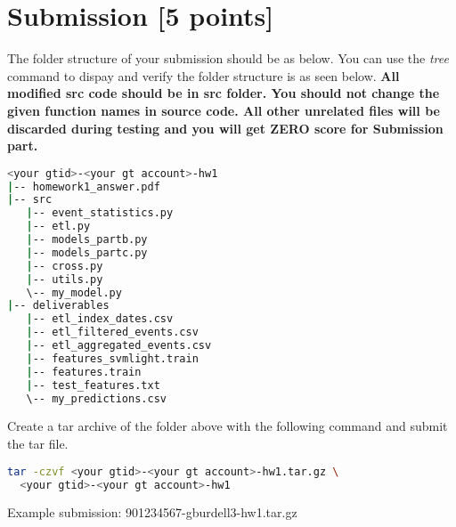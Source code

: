 \documentclass[12pt]{article}
\begin{document}
\section{Submission [5 points]}
The folder structure of your submission should be as below. You can use the \textit{tree} command to dispay and verify the folder structure is as seen below. \textbf{\color{red} All modified src code should be in src folder. You should not change the given function names in source code. All other unrelated files will be discarded during testing and you will get ZERO score for Submission part.}
\begin{lstlisting}[language=bash,frame=single]
<your gtid>-<your gt account>-hw1
|-- homework1_answer.pdf
|-- src
   |-- event_statistics.py
   |-- etl.py
   |-- models_partb.py
   |-- models_partc.py
   |-- cross.py
   |-- utils.py
   \-- my_model.py
|-- deliverables
   |-- etl_index_dates.csv
   |-- etl_filtered_events.csv
   |-- etl_aggregated_events.csv
   |-- features_svmlight.train
   |-- features.train
   |-- test_features.txt
   \-- my_predictions.csv

\end{lstlisting}
Create a tar archive of the folder above with the following command and submit the tar file.
\begin{lstlisting}[language=bash,frame=single]
tar -czvf <your gtid>-<your gt account>-hw1.tar.gz \
  <your gtid>-<your gt account>-hw1
\end{lstlisting}
Example submission: 901234567-gburdell3-hw1.tar.gz
\end{document}
